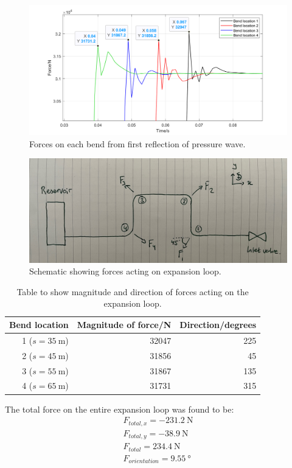 \begin{figure}[H]
    \centering
    \includegraphics[width = 0.9 \textwidth]{img/fig5.png}
    \caption{Forces on each bend from first reflection of pressure wave.}
    \label{force1}
\end{figure}

\begin{figure}[H]
    \centering
    \includegraphics[width = \textwidth]{img/fig23.jpg}
    \caption{Schematic showing forces acting on expansion loop.}
    \label{force3}
\end{figure}

\begin{table}[H]
    \centering
    \begin{tabular}{@{}rrr@{}}
        \toprule
        \textbf{Bend location} & \textbf{Magnitude of force/\si{\newton}} & \textbf{Direction/\si{degrees}}\\
        \midrule
        1 ($s = \SI{35}{\meter}$) & 32047 & 225\\
        2 ($s = \SI{45}{\meter}$) & 31856 & 45\\
        3 ($s = \SI{55}{\meter}$) & 31867 & 135\\
        4 ($s = \SI{65}{\meter}$) & 31731 & 315\\
        \bottomrule
    \end{tabular}
    \caption{Table to show magnitude and direction of forces acting on the expansion loop.}
    \label{force4}
\end{table}
The total force on the entire expansion loop was found to be:
\begin{gather}
    F_{total,x} = \SI{-231.2}{\newton}\\
    F_{total,y} = \SI{-38.9}{\newton}\\
    F_{total} = \SI{234.4}{\newton}\\
    F_{orientation} = \SI{9.55}{\degree}
\end{gather}
